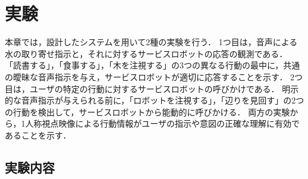 \chapter{実験}
本章では，設計したシステムを用いて2種の実験を行う．
1つ目は，音声による水の取り寄せ指示と，それに対するサービスロボットの応答の観測である．
「読書する」，「食事する」，「木を注視する」の3つの異なる行動の最中に，共通の曖昧な音声指示を与え，サービスロボットが適切に応答することを示す．
2つ目は，ユーザの特定の行動に対するサービスロボットの呼びかけである．
明示的な音声指示が与えられる前に，「ロボットを注視する」，「辺りを見回す」の2つの行動を検出して，サービスロボットから能動的に呼びかける．
両方の実験から，1人称視点映像による行動情報がユーザの指示や意図の正確な理解に有効であることを示す．

\section{実験内容}
